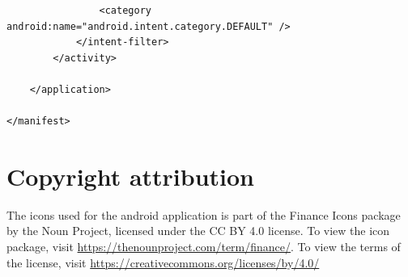 \documentclass[11pt, a4paper]{article}
\begin{document}
\begin{appendices}
\begin{lstlisting}
                <category android:name="android.intent.category.DEFAULT" />
            </intent-filter>
        </activity>

    </application>

</manifest>
\end{lstlisting}

\section{Copyright attribution}
The icons used for the android application is part of the Finance Icons package by the Noun Project, licensed under the CC BY 4.0 license. To view the icon package, visit \url{https://thenounproject.com/term/finance/}. To view the terms of the license, visit \url{https://creativecommons.org/licenses/by/4.0/}
\end{appendices}
\end{document}
